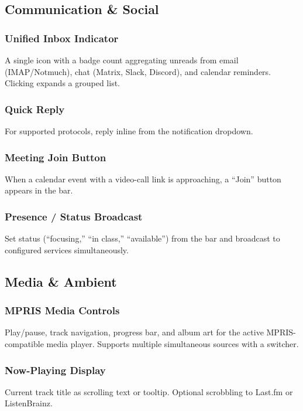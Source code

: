 \documentclass[11pt,a4paper]{article}
\begin{document}
\subsection{Communication \& Social}
\label{sec:features-comms}

\subsubsection{Unified Inbox Indicator}
A single icon with a badge count aggregating unreads from email (IMAP/Notmuch), chat (Matrix, Slack, Discord), and calendar reminders. Clicking expands a grouped list.

\subsubsection{Quick Reply}
For supported protocols, reply inline from the notification dropdown.

\subsubsection{Meeting Join Button}
When a calendar event with a video-call link is approaching, a ``Join'' button appears in the bar.

\subsubsection{Presence / Status Broadcast}
Set status (``focusing,'' ``in class,'' ``available'') from the bar and broadcast to configured services simultaneously.


\subsection{Media \& Ambient}
\label{sec:features-media}

\subsubsection{MPRIS Media Controls}
Play/pause, track navigation, progress bar, and album art for the active MPRIS-compatible media player. Supports multiple simultaneous sources with a switcher.

\subsubsection{Now-Playing Display}
Current track title as scrolling text or tooltip. Optional scrobbling to Last.fm or ListenBrainz.
\end{document}
